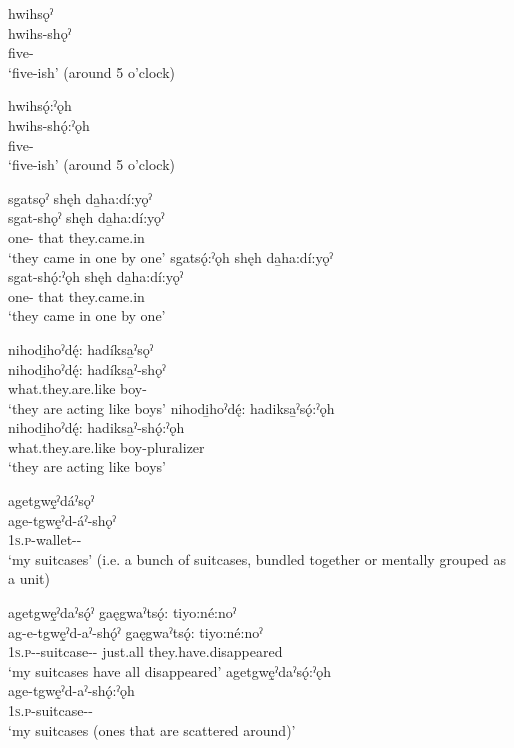 \ea\label{ex:sosoex}
\ea hwihsǫˀ\\
\gll hwihs-shǫˀ\\
five-{\pluralizer}\\
\glt ‘five-ish’ (around 5 o’clock)

\ex hwihsǫ́:ˀǫh\\
\gll hwihs-shǫ́:ˀǫh\\
five-{\pluralizer}\\
\glt ‘five-ish’ (around 5 o’clock)\\
\z
\z

\newpage
\ea\label{ex:sosoex2}
\ea sgatsǫˀ shęh da̱ha:dí:yǫˀ\\
\gll sgat-shǫˀ shęh da̱ha:dí:yǫˀ\\
{one-\pluralizer} that they.came.in\\
\glt ‘they came in one by one’
\ex sgatsǫ́:ˀǫh shęh da̱ha:dí:yǫˀ\\
\gll sgat-shǫ́:ˀǫh shęh da̱ha:dí:yǫˀ \\
{one-\pluralizer} that they.came.in \\
\glt ‘they came in one by one’ 
\z
\z

\ea\label{ex:sosoex3}
\ea nihodi̱hoˀdę́: hadíksa̱ˀsǫˀ\\
\gll nihodi̱hoˀdę́: hadíksa̱ˀ-shǫˀ\\
what.they.are.like {boy-\pluralizer}\\
\glt ‘they are acting like boys’
\ex nihodi̱hoˀdę́: hadiksa̱ˀsǫ́:ˀǫh\\
\gll nihodi̱hoˀdę́: hadiksa̱ˀ-shǫ́:ˀǫh\\
what.they.are.like {boy-pluralizer}\\
\glt ‘they are acting like boys’
\z
\z

\ea\label{ex:sosoex4}
\ea agetgwę̱ˀdáˀsǫˀ\\
\gll age-tgwę̱ˀd-áˀ-shǫˀ \\
\textsc{1s.p}-wallet-{\nsf}-{\pluralizer}\\
\glt ‘my suitcases’ (i.e. a bunch of suitcases, bundled together or mentally grouped as a unit)

\ex agetgwę̱ˀdaˀsǫ́ˀ gaęgwaˀtsǫ́: tiyo:né:noˀ\\
\gll ag-e-tgwę̱ˀd-aˀ-shǫ́ˀ gaęgwaˀtsǫ́: tiyo:né:noˀ\\
\textsc{1s.p-\joinerE}-suitcase-{\nsf-\pluralizer} just.all they.have.disappeared \\
\glt ‘my suitcases have all disappeared’ 
\ex agetgwę̱ˀdaˀsǫ́:ˀǫh\\
\gll age-tgwę̱ˀd-aˀ-shǫ́:ˀǫh\\
 \textsc{1s.p}-suitcase-{\nsf}-{\pluralizer}\\
\glt `my suitcases (ones that are scattered around)'
\z
\z

